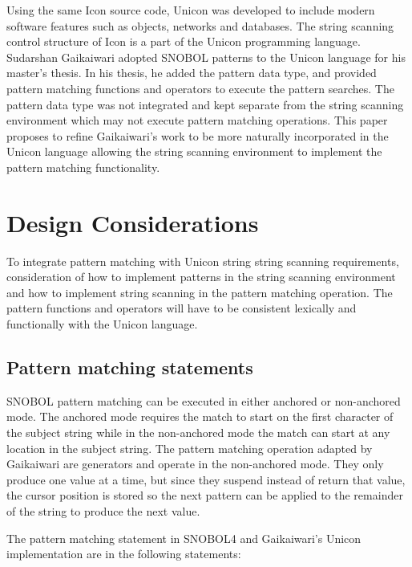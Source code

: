 \documentclass{article}
\begin{document}
Using the same Icon source code, Unicon was developed to include modern software features such as objects, networks and databases. \cite{JefferyUnicon} The string scanning control structure of Icon is a part of the Unicon programming language.  Sudarshan Gaikaiwari adopted SNOBOL patterns to the Unicon language for his master's thesis.  In his thesis, he added the pattern data type, and provided pattern matching functions and operators to execute the pattern searches.\cite{Gaikaiwari2005}  The pattern data type was not integrated and kept separate from the string scanning environment which may not execute pattern matching operations.  This paper proposes to refine Gaikaiwari's work to be more naturally incorporated in the Unicon language allowing the string scanning environment to implement the pattern matching functionality.

\section{Design Considerations}

To integrate pattern matching with Unicon string string scanning requirements, consideration of how to implement patterns in the string scanning environment and how to implement string scanning in the pattern matching operation.  The pattern functions and operators will have to be consistent lexically and functionally with the Unicon language.

\subsection{Pattern matching statements}
SNOBOL pattern matching can be executed in either anchored or non-anchored mode.  The anchored mode requires the match to start on the first character of the subject string while in the non-anchored mode the match can start at any location in the subject string.\cite{Snobol}  The pattern matching operation adapted by Gaikaiwari are generators and operate in the non-anchored mode.\cite{Gaikaiwari2005}  They only produce one value at a time, but since they suspend instead of return that value, the cursor position is stored so the next pattern can be applied to the remainder of the string to produce the next value. \cite{JefferyUnicon}

The pattern matching statement in SNOBOL4 and Gaikaiwari's Unicon implementation are in the following statements:\\
\end{document}
